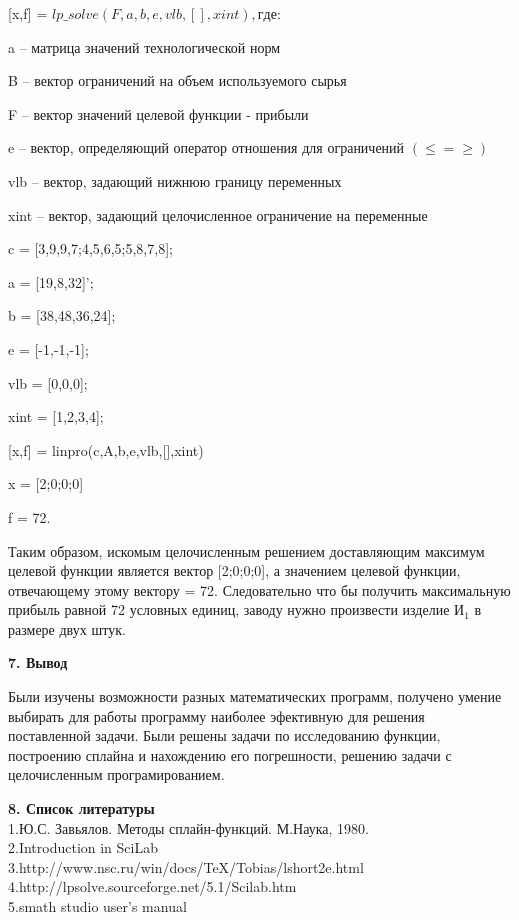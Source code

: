 \documentclass[russian,utf8,nocolumnxxxi,nocolumnxxxii]{eskdtext}
\begin{document}
[x,f] = $lp\_solve(F,a,b,e,vlb,[],xint), где:$ 

a – матрица значений технологической норм 

B – вектор ограничений на объем используемого сырья 

F – вектор значений целевой функции - прибыли 

e – вектор, определяющий оператор отношения для ограничений $(\leq = \geq)$ 

vlb – вектор, задающий нижнюю границу переменных 

xint – вектор, задающий целочисленное ограничение на переменные 


c = [3,9,9,7;4,5,6,5;5,8,7,8]; 

a = [19,8,32]’; 

b = [38,48,36,24]; 

e = [-1,-1,-1]; 

vlb = [0,0,0]; 

xint = [1,2,3,4]; 

[x,f] = linpro(c,A,b,e,vlb,[],xint) 

x = [2;0;0;0] 

f = 72. 

Таким образом, искомым целочисленным решением доставляющим максимум целевой функции является вектор [2;0;0;0], а значением целевой функции, отвечающему этому вектору = 72. Следовательно что бы получить максимальную прибыль равной 72 условных единиц, заводу нужно произвести изделие И$_1$ в размере двух штук.

\newpage
\begin{center} {\bf7. Вывод} \end{center}
Были изучены возможности разных математических программ, получено умение выбирать для работы программу наиболее эфективную для решения поставленной задачи. Были решены задачи по исследованию функции, построению сплайна и нахождению его погрешности, решению задачи с целочисленным програмированием.



\newpage
{\bf8. Список литературы}
\\1.Ю.С. Завьялов. Методы сплайн-функций. М.Наука, 1980.
\\2.Introduction in SciLab
\\3.http://www.nsc.ru/win/docs/TeX/Tobias/lshort2e.html
\\4.http://lpsolve.sourceforge.net/5.1/Scilab.htm
\\5.smath studio user’s manual
\end{document}
